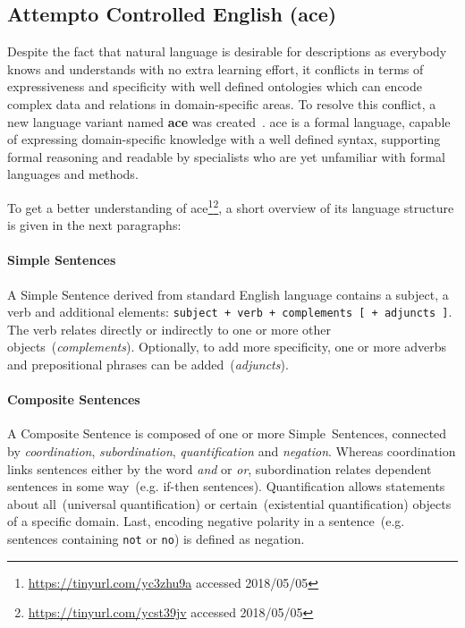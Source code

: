 \subsection{Attempto Controlled English (\gls{ace})}
Despite the fact that natural language is desirable for descriptions as everybody knows and understands with no extra learning effort, it conflicts in terms of expressiveness and specificity with well defined ontologies which can encode complex data and relations in domain-specific areas. To resolve this conflict, a new language variant named \textbf{\gls{ace}} was created~\cite{fuchs2008}. \gls{ace} is a formal language, capable of expressing domain-specific knowledge with a well defined syntax, supporting formal reasoning and readable by specialists who are yet unfamiliar with formal languages and methods.

To get a better understanding of \gls{ace}\footnote{\url{https://tinyurl.com/yc3zhu9a} accessed 2018/05/05}\footnote{\url{https://tinyurl.com/ycst39jv} accessed 2018/05/05}, a short overview of its language structure is given in the next paragraphs:
 
\paragraph{Simple Sentences} A Simple Sentence derived from standard English language contains a subject, a verb and additional elements: \texttt{subject + verb + complements~[~+~adjuncts~]}. The verb relates directly or indirectly to one or more other objects~(\textit{complements}). Optionally, to add more specificity, one or more adverbs and prepositional phrases can be added~(\textit{adjuncts}). 

\paragraph{Composite Sentences} A Composite Sentence is composed of one or more Simple~Sentences, connected by \textit{coordination},
\textit{subordination}, \textit{quantification} and \textit{negation}. Whereas coordination links sentences either by the word \textit{and} or \textit{or}, subordination relates dependent sentences in some way~(e.g. if-then sentences). Quantification allows statements about all~(universal quantification) or certain~(existential quantification) objects of a specific domain. Last, encoding negative polarity in a sentence~(e.g. sentences containing \texttt{not} or \texttt{no}) is defined as negation. 

